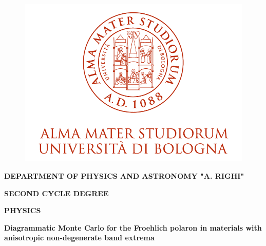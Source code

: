 \begin{titlepage}
        \thispagestyle{fancy}
    \begin{figure}[H]
        \vspace{-1.5cm} %
        \centering
        \includegraphics[scale=1.05]{logo_unibo.png}
    \end{figure}
    
    \vspace{3mm}
    
    \begin{center}
        \bf {DEPARTMENT OF PHYSICS AND ASTRONOMY "A. RIGHI"}
    \end{center}
    
    \vspace{3mm}
    
    \begin{center}
        \bf \large{SECOND CYCLE DEGREE}
    \end{center}
    
    \vspace{0.7mm}
    
    \begin{center}
        \bf \large{PHYSICS}
    \end{center}
    
    \vspace{15mm}
    
    \begin{center}
        {\huge{\bf Diagrammatic Monte Carlo for the Froehlich polaron in materials with anisotropic non-degenerate band extrema}}
    \end{center}
    

\end{titlepage}
